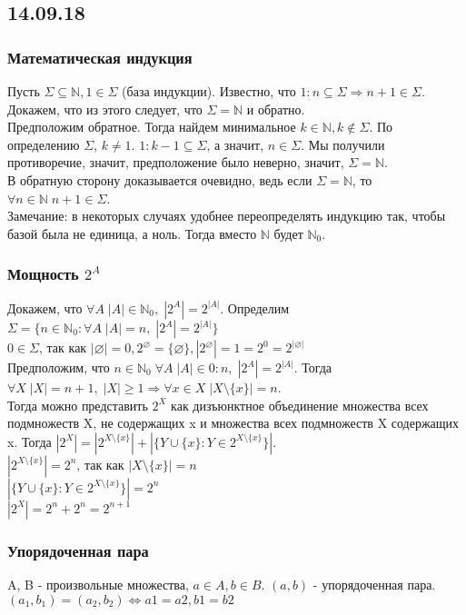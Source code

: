 \subsection{14.09.18}
\subsubsection{Математическая индукция}
Пусть $\Sigma \subseteq \mathbb{N}, 1 \in \Sigma$ (база индукции). Известно, что $1:n \subseteq \Sigma \Rightarrow n + 1 \in \Sigma$. Докажем, что из этого следует, что $\Sigma = \mathbb{N}$ и обратно.\\
Предположим обратное. Тогда найдем минимальное $k \in \mathbb{N}, k \not\in \Sigma$. По определению $\Sigma$, $k \not= 1$. $1:k - 1 \subseteq \Sigma$, а значит, $n \in \Sigma$. Мы получили противоречие, значит, предположение было неверно, значит, $\Sigma = \mathbb{N}$.\\
В обратную сторону доказывается очевидно, ведь если $\Sigma = \mathbb{N}$, то $\forall n \in \mathbb{N} \; n + 1 \in \Sigma$.\\
Замечание: в некоторых случаях удобнее переопределять индукцию так, чтобы базой была не единица, а ноль. Тогда вместо $\mathbb{N}$ будет $\mathbb{N}_0$.
\subsubsection{Мощность $2^A$}
Докажем, что $\forall A \; |A| \in \mathbb{N}_0 , \; |2^A| = 2^{|A|}$. Определим $\Sigma = \{n \in \mathbb{N}_0 : \forall A \; |A| = n , \; |2^A| = 2^{|A|}\}$\\
$0 \in \Sigma$, так как $|\varnothing| = 0, 2^{\varnothing} = \{\varnothing\}, |2^{\varnothing}| = 1 = 2^0 = 2^{|\varnothing|}$ \\
Предположим, что $n \in \mathbb{N}_0 \; \forall A \; |A| \in 0:n , \; |2^A| = 2^{|A|}$. Тогда $\forall X \;  |X| = n + 1 , \; |X| \geq 1 \Rightarrow \forall x \in X \; |X \setminus \{x\}| = n$. \\
Тогда можно представить $2^X$ как дизъюнктное объединение множества всех подмножеств X, не содержащих x и множества всех подмножеств X содержащих x. Тогда $|2^X| = |2^{X \setminus \{x\}}| + |{\{Y \cup \{x\} : Y \in 2^{X \setminus \{x\}}\}}|$. \\
$|2^{X \setminus \{x\}}| = 2^n$, так как $|X \setminus \{x\}| = n$ \\
$|\{Y \cup \{x\} : Y \in 2^{X \setminus \{x\}}\}| = 2^n$ \\
$|2^X| = 2^n + 2^n = 2^{n + 1}$
\subsubsection{Упорядоченная пара}
A, B - произвольные множества, $a \in A, b \in B$. $(a, b)$ - упорядоченная пара. $(a_1, b_1) = (a_2, b_2) \Leftrightarrow a1 = a2, b1 = b2$
